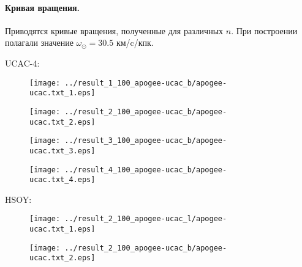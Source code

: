 \documentclass{matmex-diploma-custom}
\begin{document}
\pagebreak
\paragraph{Кривая вращения.} Приводятся кривые вращения, полученные для различных $n$. При построении полагали значение $\omega_{\odot} = 30.5$ км/c/кпк.

\par UCAC-4:
\begin{figure}[h!]
\begin{minipage}[h]{0.49\linewidth}
        \texttt{[image: ../result\_1\_100\_apogee-ucac\_b/apogee-ucac.txt\_1.eps]}
\end{minipage}
\hfill
\begin{minipage}[h]{0.49\linewidth}
        \texttt{[image: ../result\_2\_100\_apogee-ucac\_b/apogee-ucac.txt\_2.eps]}
\end{minipage}
\end{figure}
\begin{figure}[h!]
\begin{minipage}[h]{0.49\linewidth}
        \texttt{[image: ../result\_3\_100\_apogee-ucac\_b/apogee-ucac.txt\_3.eps]}
\end{minipage}
\hfill
\begin{minipage}[h]{0.49\linewidth}
        \texttt{[image: ../result\_4\_100\_apogee-ucac\_b/apogee-ucac.txt\_4.eps]}
\end{minipage}
\end{figure}

\par HSOY:
\begin{figure}[h!]
\begin{minipage}[h]{0.49\linewidth}
        \texttt{[image: ../result\_2\_100\_apogee-ucac\_l/apogee-ucac.txt\_1.eps]}
\end{minipage}
\hfill
\begin{minipage}[h]{0.49\linewidth}
        \texttt{[image: ../result\_2\_100\_apogee-ucac\_b/apogee-ucac.txt\_2.eps]}
\end{minipage}
\end{figure}

\pagebreak
\end{document}

